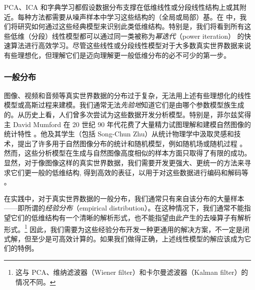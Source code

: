 \documentclass[../../book-main_zh.tex]{subfiles}
\begin{document}
PCA、ICA
和字典学习都假设数据分布支撑在低维线性或分段线性结构上或其附近。每种方法都需要从噪声样本中学习这些结构的（全局或局部）基。在
中，我们将研究如何通过这些经典模型来识别此类低维结构。特别是，我们将看到所有这些低维（分段）线性模型都可以通过同一类被称为\textit{幂迭代}（power
iteration）\cite{Zhai-2020}
的快速算法进行高效学习。尽管这些线性或分段线性模型对于大多数真实世界数据来说有些理想化，但理解它们是迈向理解更一般低维分布的必不可少的第一步。

\subsubsection{一般分布}\label{sec:denoising-intro}

图像、视频和音频等真实世界数据的分布过于复杂，无法用上述有些理想化的线性模型或高斯过程来建模。我们通常无法\textit{先验地}知道它们是由哪个参数模型族生成的。从历史上看，人们曾多次尝试为这些数据开发分析模型。特别是，菲尔兹奖得主
David Mumford 在 20 世纪 90 年代花费了大量精力试图理解和建模自然图像的统计特性
\cite{Mumford1996TheSD}。他及其学生（包括 Song-Chun
Zhu）从统计物理学中汲取灵感和技术，提出了许多用于自然图像分布的统计和随机模型，例如随机场或随机过程
\cite{Zhu-Entropy-1997,Zhu1997LearningGP,Zhu1997Prior,Huang-Mumford,Mumford-1999,Lee-Mumford}。
然而，这些分析模型在生成与自然图像高度相似的样本方面只取得了有限的成功。显然，对于像图像这样的真实世界数据，我们需要开发更强大、更统一的方法来寻求它们更一般的低维结构,
得到高效的表征，以用于对这些数据进行编码和解码等 \cite{ALLARD2012435,LITTLE2017504}。

在实践中，对于真实世界数据的一般分布，我们通常只有来自该分布的大量样本——即所谓的\textit{经验分布}（empirical
distribution）。在这种情况下，我们通常不能指望它们的低维结构有一个清晰的解析形式，也不能指望由此产生的去噪算子有解析形式。\footnote{这与
PCA、维纳滤波器（Wiener filter）和卡尔曼滤波器（Kalman filter）的情况不同。}
因此，我们需要为这些经验分布开发一种更通用的解决方案，不一定是闭式解，但至少是可高效计算的。如果我们做得正确，上述线性模型的解应该成为它们的特例。
\end{document}
